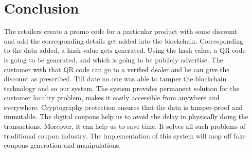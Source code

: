 \chapter{Conclusion}

\par
The retailers create a promo code for a particular product with some
discount and add the corresponding details get added into the blockchain.
Corresponding to the data added, a hash value gets generated. Using the hash
value, a QR code is going to be generated, and which is going to be publicly
advertise. The customer with that QR code can go to a verified dealer and he
can give the discount as prescribed. Till date no one was able to tamper the
blockchain technology and so our system.
The system provides permanent solution for the customer locality problem, makes it easily accessible from anywhere and everywhere. Cryptography protection ensures that the data is tamper-proof and immutable. The digital coupons help us to avoid the delay in physically doing the transactions. Moreover, it can help us to save time. It solves all such problems of traditional coupon industry. The implementation of this system will mop off fake coupons generation and manipulations. 
